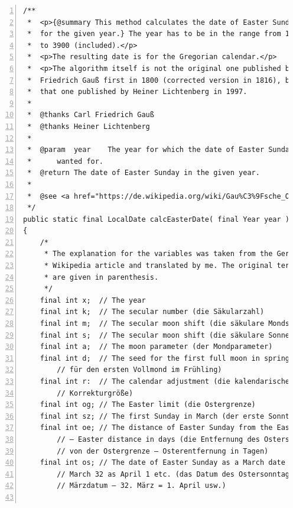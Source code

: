 \documentclass[11pt,a4paper, titlepage, parskip=half, headsepline, footsepline, cleardoublepage=current, headheight=1cm]{scrbook}
\begin{document}
\begin{lstlisting}[numbers=left,caption={Gauss' Easter algorithm\autocite{WIKIPEDIA:DateOfEaster,WIKIPEDIA:Gaussche_Osterformel}},label={listing:GaussEaster}]
/**
 *  <p>{@summary This method calculates the date of Easter Sunday 
 *  for the given year.} The year has to be in the range from 1583 
 *  to 3900 (included).</p>
 *  <p>The resulting date is for the Gregorian calendar.</p>
 *  <p>The algorithm itself is not the original one published by Carl
 *  Friedrich Gauß first in 1800 (corrected version in 1816), but
 *  that one published by Heiner Lichtenberg in 1997.
 *
 *  @thanks Carl Friedrich Gauß
 *  @thanks Heiner Lichtenberg  
 *
 *  @param  year    The year for which the date of Easter Sunday is 
 *      wanted for.
 *  @return The date of Easter Sunday in the given year.
 *  
 *  @see <a href="https://de.wikipedia.org/wiki/Gau%C3%9Fsche_Osterformel">Gaußsche Osterformel</a>
 */
public static final LocalDate calcEasterDate( final Year year )
{
    /*
     * The explanation for the variables was taken from the German
     * Wikipedia article and translated by me. The original terms
     * are given in parenthesis.
     */
    final int x;  // The year
    final int k;  // The secular number (die Säkularzahl)   
    final int m;  // The secular moon shift (die säkulare Mondschaltung)
    final int s;  // The secular moon shift (die säkulare Sonnenschaltung)
    final int a;  // The moon parameter (der Mondparameter)
    final int d;  // The seed for the first full moon in spring (der Keim 
        // für den ersten Vollmond im Frühling)
    final int r:  // The calendar adjustment (die kalendarische
        // Korrekturgröße)
    final int og; // The Easter limit (die Ostergrenze)
    final int sz; // The first Sunday in March (der erste Sonntag im März)
    final int oe; // The distance of Easter Sunday from the Easter limit
        // – Easter distance in days (die Entfernung des Ostersonntags
        // von der Ostergrenze – Osterentfernung in Tagen)
    final int os; // The date of Easter Sunday as a March date with 
        // March 32 as April 1 etc. (das Datum des Ostersonntags als 
        // Märzdatum – 32. März = 1. April usw.)
    

\end{lstlisting}
\end{document}
